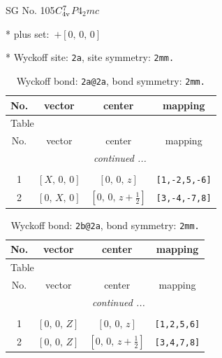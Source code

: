\documentclass[fleqn,8pt]{jsarticle}
\begin{document}
\setcounter{MaxMatrixCols}{32}

\renewcommand{\tablename}{Table~}
\renewcommand{\figurename}{Figure~}
\begin{center}
\LARGE
SG No. 105\quad$C_{\rm 4v}^{7}$\quad$P4_2mc$\quad[ tetragonal ]
\end{center}

* plus set:\,\,\,$+\left[ 0,\, 0,\, 0 \right]$


* Wyckoff site: {\tt 2a}, site symmetry: {\tt 2mm.}
\renewcommand{\arraystretch}{1.2}
\begin{longtable}{cccc}
\caption{Wyckoff bond: {\tt 2a@2a}, bond symmetry: {\tt 2mm.}}
 \\
 \hline \hline
No. & vector & center & mapping \\ \hline \endfirsthead

\multicolumn{3}{l}{\tablename\ \thetable{}} \\
 \hline \hline
No. & vector & center & mapping \\ \hline \endhead

 \hline \hline
\multicolumn{3}{r}{\footnotesize\it continued ...} \\ \endfoot

 \hline \hline
\multicolumn{3}{r}{} \\ \endlastfoot

1 & $\left[ X,\, 0,\, 0 \right]$ & $\left[ 0,\, 0,\, z \right]$ & {\tt [1,-2,5,-6]} \\ \hline
2 & $\left[ 0,\, X,\, 0 \right]$ & $\left[ 0,\, 0,\, z + \frac{1}{2} \right]$ & {\tt [3,-4,-7,8]} \\
\end{longtable}
\renewcommand{\arraystretch}{1.2}
\begin{longtable}{cccc}
\caption{Wyckoff bond: {\tt 2b@2a}, bond symmetry: {\tt 2mm.}}
 \\
 \hline \hline
No. & vector & center & mapping \\ \hline \endfirsthead

\multicolumn{3}{l}{\tablename\ \thetable{}} \\
 \hline \hline
No. & vector & center & mapping \\ \hline \endhead

 \hline \hline
\multicolumn{3}{r}{\footnotesize\it continued ...} \\ \endfoot

 \hline \hline
\multicolumn{3}{r}{} \\ \endlastfoot

1 & $\left[ 0,\, 0,\, Z \right]$ & $\left[ 0,\, 0,\, z \right]$ & {\tt [1,2,5,6]} \\ \hline
2 & $\left[ 0,\, 0,\, Z \right]$ & $\left[ 0,\, 0,\, z + \frac{1}{2} \right]$ & {\tt [3,4,7,8]} \\
\end{longtable}
\end{document}
